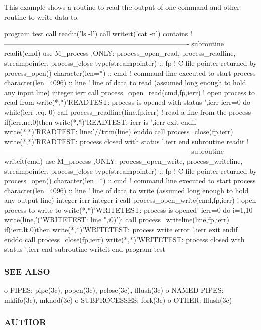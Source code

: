 This example shows a routine to read the output of one command and other routine to write data to. \begin{DoxyVerb}program test
   call readit('ls -l')
   call writeit('cat -n')
contains
!-------------------------------------------------------------------------------
subroutine readit(cmd)
   use M_process ,ONLY: process_open_read, process_readline, streampointer, process_close
   type(streampointer) :: fp    ! C file pointer returned by process_open()
   character(len=*)    :: cmd   ! command line executed to start process
   character(len=4096) :: line  ! line of data to read (assumed long enough to hold any input line)
   integer ierr
   call process_open_read(cmd,fp,ierr)   ! open process to read from
   write(*,*)'READTEST: process is opened with status ',ierr
   ierr=0
   do while(ierr .eq. 0)
      call process_readline(line,fp,ierr)  ! read a line from the process
      if(ierr.ne.0)then
         write(*,*)'READTEST: ierr is ',ierr
         exit
      endif
      write(*,*)'READTEST: line:'//trim(line)
   enddo
   call process_close(fp,ierr)
   write(*,*)'READTEST: process closed with status ',ierr
end subroutine readit
!-------------------------------------------------------------------------------
subroutine writeit(cmd)
use M_process ,ONLY: process_open_write, process_writeline, streampointer, process_close
type(streampointer) :: fp       ! C file pointer returned by process_open()
character(len=*) :: cmd         ! command line executed to start process
   character(len=4096) :: line  ! line of data to write (assumed long enough to hold any output line)
   integer ierr
   integer i
   call process_open_write(cmd,fp,ierr)   ! open process to write to
   write(*,*)'WRITETEST: process is opened'
   ierr=0
   do i=1,10
      write(line,'("WRITETEST: line ",i0)')i
      call process_writeline(line,fp,ierr)
      if(ierr.lt.0)then
         write(*,*)'WRITETEST: process write error ',ierr
         exit
      endif
   enddo
   call process_close(fp,ierr)
   write(*,*)'WRITETEST: process closed with status ',ierr
end subroutine writeit
end program test
\end{DoxyVerb}


\subsubsection*{S\+EE A\+L\+SO}

o P\+I\+P\+ES\+: pipe(3c), popen(3c), pclose(3c), fflush(3c) o N\+A\+M\+ED P\+I\+P\+ES\+: mkfifo(3c), mknod(3c) o S\+U\+B\+P\+R\+O\+C\+E\+S\+S\+ES\+: fork(3c) o O\+T\+H\+ER\+: fflush(3c) \subsubsection*{A\+U\+T\+H\+OR}

